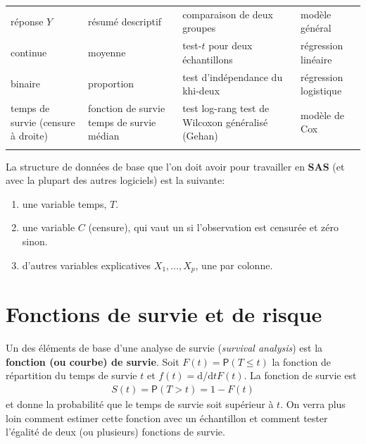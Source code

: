 \documentclass[
  11pt,
  letterpaper,
]{book}
\providecommand{\tightlist}{%
  \setlength{\itemsep}{0pt}\setlength{\parskip}{0pt}}
\theoremstyle{definition}
\theoremstyle{definition}
\theoremstyle{definition}
\theoremstyle{remark}
\begin{document}
\begin{longtable}[]{@{}
  >{\raggedright\arraybackslash}p{}
  >{\raggedright\arraybackslash}p{}
  >{\raggedright\arraybackslash}p{}
  >{\raggedright\arraybackslash}p{}@{}}
\toprule
réponse \(Y\) & résumé descriptif & comparaison de deux groupes & modèle général \\ \addlinespace
\midrule
\endhead
continue & moyenne & test-\(t\) pour deux échantillons & régression linéaire \\ \addlinespace
binaire & proportion & test d'indépendance du khi-deux & régression logistique \\ \addlinespace
temps de survie (censure à droite) & fonction de survie temps de survie médian & test log-rang test de Wilcoxon généralisé (Gehan) & modèle de Cox \\ \addlinespace
\bottomrule
\end{longtable}

La structure de données de base que l'on doit avoir pour travailler en \textbf{SAS} (et avec la plupart des autres logiciels) est la suivante:

\begin{enumerate}
\def\labelenumi{\arabic{enumi})}
\tightlist
\item
  une variable temps, \(T\).
\item
  une variable \(C\) (censure), qui vaut un si l'observation est censurée et zéro sinon.
\item
  d'autres variables explicatives \(X_1, \ldots, X_p\), une par colonne.
\end{enumerate}

\hypertarget{fonctions-de-survie-et-de-risque}{%
\section{Fonctions de survie et de risque}\label{fonctions-de-survie-et-de-risque}}

Un des éléments de base d'une analyse de survie (\emph{survival analysis}) est la \textbf{fonction (ou courbe) de survie}. Soit \(F(t)={\mathsf P}\left(T \leq t\right)\) la fonction de répartition du temps de survie \(t\) et \(f(t) = \mathrm{d}/ \mathrm{d}t F(t)\). La fonction de survie est
\begin{align*}
S(t)= {\mathsf P}\left(T > t\right) = 1-F(t)
\end{align*}
et donne la probabilité que le temps de survie soit supérieur à \(t\). On verra plus loin comment estimer cette fonction avec un échantillon et comment tester l'égalité de deux (ou plusieurs) fonctions de survie.
\end{document}
